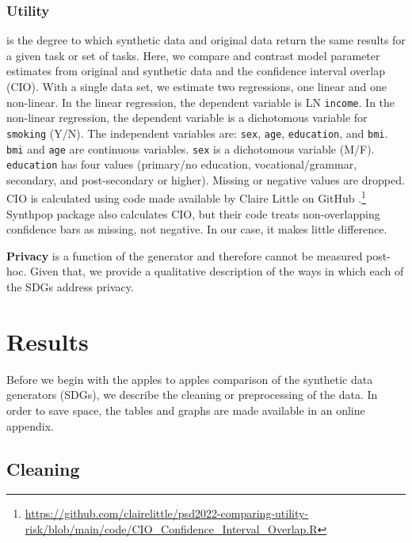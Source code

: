 \documentclass[runningheads]{llncs}
\begin{document}
\subsubsection{Utility} is the degree to which synthetic data and original data return the same results for a given task or set of tasks.  Here, we compare and contrast model parameter estimates from original and synthetic data and the confidence interval overlap (CIO).  With a single data set, we estimate two regressions, one linear and one non-linear.  In the linear regression, the dependent variable is LN \texttt{income}.  In the non-linear regression, the dependent variable is a dichotomous variable for \texttt{smoking} (Y/N).  The independent variables are: \texttt{sex}, \texttt{age}, \texttt{education}, and \texttt{bmi}.  \texttt{bmi} and \texttt{age} are continuous variables.  \texttt{sex} is a dichotomous variable (M/F).  \texttt{education} has four values (primary/no education, vocational/grammar, secondary, and post-secondary or higher).  Missing or negative values are dropped.  CIO is calculated using code made available by Claire Little on GitHub \cite{little2022comparing,karr2006framework}.\footnote{\url{https://github.com/clairelittle/psd2022-comparing-utility-risk/blob/main/code/CIO_Confidence_Interval_Overlap.R}}  Synthpop package also calculates CIO, but their code treats non-overlapping confidence bars as missing, not negative.  In our case, it makes little difference.

{\bf Privacy} is a function of the generator and therefore cannot be measured post-hoc.  Given that, we provide a qualitative description of the ways in which each of the SDGs address privacy.  

\section{Results}\label{sec:results}

Before we begin with the apples to apples comparison of the synthetic data generators (SDGs), we describe the cleaning or preprocessing of the data.  In order to save space, the tables and graphs are made available in an online appendix.  

\subsection{Cleaning}
\end{document}
